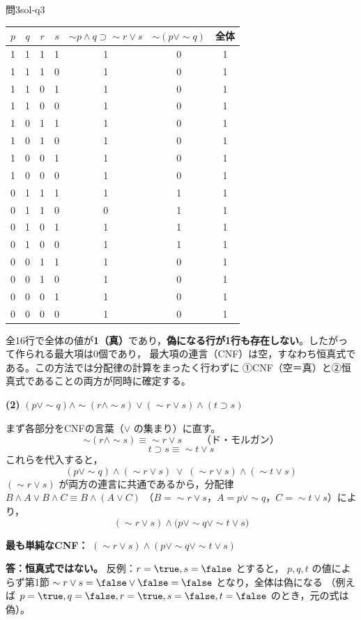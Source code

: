 \documentclass[autodetect-engine,dvi=dvipdfmx,ja=standard]{bxjsarticle}
\begin{document}
\begin{solution}{問3}{sol-q3}
\begin{center}
\scriptsize
\begin{tabular}{cccc|c|c|c}
\toprule
\(p\) & \(q\) & \(r\) & \(s\) & \(\sim p\land q\supset\sim r\lor s\) & \(\sim(p\lor\sim q)\) & 全体 \\
\midrule
1&1&1&1&1&0&1\\
1&1&1&0&1&0&1\\
1&1&0&1&1&0&1\\
1&1&0&0&1&0&1\\
1&0&1&1&1&0&1\\
1&0&1&0&1&0&1\\
1&0&0&1&1&0&1\\
1&0&0&0&1&0&1\\
0&1&1&1&1&1&1\\
0&1&1&0&0&1&1\\
0&1&0&1&1&1&1\\
0&1&0&0&1&1&1\\
0&0&1&1&1&0&1\\
0&0&1&0&1&0&1\\
0&0&0&1&1&0&1\\
0&0&0&0&1&0&1\\
\bottomrule
\end{tabular}
\end{center}

全16行で全体の値が\textbf{1（真）}であり，\textbf{偽になる行が1行も存在しない}。したがって作られる最大項は0個であり，
最大項の連言（CNF）は空，すなわち恒真式である。この方法では分配律の計算をまったく行わずに
①CNF（空＝真）と②恒真式であることの両方が同時に確定する。

\textbf{(2)} \((p\lor\sim q)\land\sim(r\land\sim s)\lor(\sim r\lor s)\land(t\supset s)\)

まず各部分をCNFの言葉（\(\lor\) の集まり）に直す。
\[
  \sim(r\land\sim s)\equiv\sim r\lor s
  \qquad\text{（ド・モルガン）}
\]
\[
  t\supset s\equiv\sim t\lor s
\]
これらを代入すると，
\[
  (p\lor\sim q)\land(\sim r\lor s)\;\lor\;(\sim r\lor s)\land(\sim t\lor s)
\]
\((\sim r\lor s)\) が両方の連言に共通であるから，分配律 \(B\land A\lor B\land C\equiv B\land(A\lor C)\)
（\(B=\sim r\lor s\)，\(A=p\lor\sim q\)，\(C=\sim t\lor s\)）により，
\[
  (\sim r\lor s)\land\bigl(p\lor\sim q\lor\sim t\lor s\bigr)
\]

\textbf{最も単純なCNF：} \((\sim r\lor s)\land(p\lor\sim q\lor\sim t\lor s)\)

\textbf{答：恒真式ではない。} 反例：\(r=\true,s=\false\) とすると，
\(p,q,t\) の値によらず第1節 \(\sim r\lor s=\false\lor\false=\false\) となり，全体は偽になる
（例えば \(p=\true,q=\false,r=\true,s=\false,t=\false\) のとき，元の式は偽）。


\end{solution}
\end{document}
